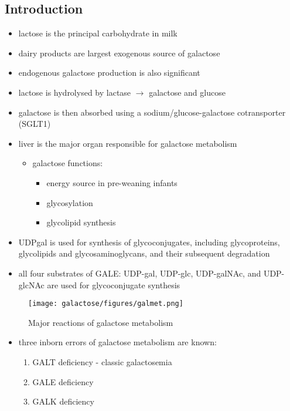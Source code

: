 \documentclass[12pt]{scrartcl}
\begin{document}
\subsection{Introduction}
\label{sec:orgd6d4d4e}
\begin{itemize}
\item lactose is the principal carbohydrate in milk
\item dairy products are largest exogenous source of galactose
\item endogenous galactose production is also significant
\item lactose is hydrolysed by lactase \(\to\) galactose and glucose
\item galactose is then absorbed using a sodium/glucose-galactose cotransporter (SGLT1)
\item liver is the major organ responsible for galactose metabolism
\begin{itemize}
\item galactose functions:
\begin{itemize}
\item energy source in pre-weaning infants
\item glycosylation
\item glycolipid synthesis
\end{itemize}
\end{itemize}

\item UDPgal is used for synthesis of glycoconjugates, including
glycoproteins, glycolipids and glycosaminoglycans, and their
subsequent degradation
\item all four substrates of GALE: UDP-gal, UDP-glc, UDP-galNAc, and
UDP-glcNAc are used for glycoconjugate synthesis
\end{itemize}

\begin{figure}[htbp]
\centering
\texttt{[image: galactose/figures/galmet.png]}
\caption{\label{fig:org165e502}Major reactions of galactose metabolism}
\end{figure}

\begin{itemize}
\item three inborn errors of galactose metabolism are known:
\begin{enumerate}
\item GALT deficiency - classic galactosemia
\item GALE deficiency
\item GALK deficiency
\end{enumerate}
\end{itemize}
\end{document}
